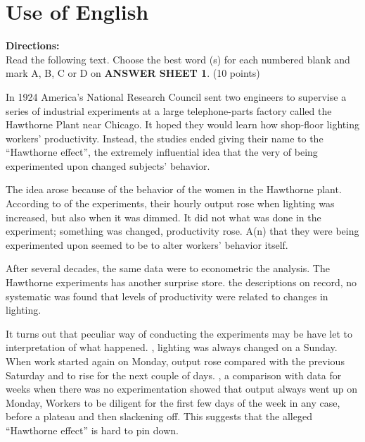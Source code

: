 


\section{Use of English}

\noindent
\textbf{Directions:}\\
Read the following text. Choose the best word (s) for each numbered
blank and mark A, B, C or D on \textbf{ANSWER
	SHEET 1}. (10 points)


\TiGanSpace


In 1924 America's National Research Council sent two engineers to
supervise a series of industrial experiments at a large telephone-parts
factory called the Hawthorne Plant near Chicago. It hoped they would
learn how shop-floor lighting \cloze workers' productivity.
Instead, the studies ended \cloze giving their name to the
``Hawthorne effect'', the extremely influential idea that the very
\cloze of being experimented upon changed subjects' behavior.

The idea arose because of the \cloze behavior of the women in the
Hawthorne plant. According to \cloze of the experiments, their
hourly output rose when lighting was increased, but also when it was
dimmed. It did not \cloze what was done in the experiment;
\cloze something was changed, productivity rose. A(n)
\cloze that they were being experimented upon seemed to be
\cloze to alter workers' behavior \cloze itself.

After several decades, the same data were \cloze to econometric
the analysis. The Hawthorne experiments has another surprise store.
\cloze the descriptions on record, no systematic \cloze
was found that levels of productivity were related to changes in
lighting.

It turns out that peculiar way of conducting the experiments may be have
let to \cloze interpretation of what happened. \cloze ,
lighting was always changed on a Sunday. When work started again on
Monday, output \cloze rose compared with the previous Saturday
and \cloze to rise for the next couple of days. \cloze ,
a comparison with data for weeks when there was no experimentation
showed that output always went up on Monday, Workers \cloze to
be diligent for the first few days of the week in any case, before
\cloze a plateau and then slackening off. This suggests that the
alleged ``Hawthorne effect'' is hard to pin down.


